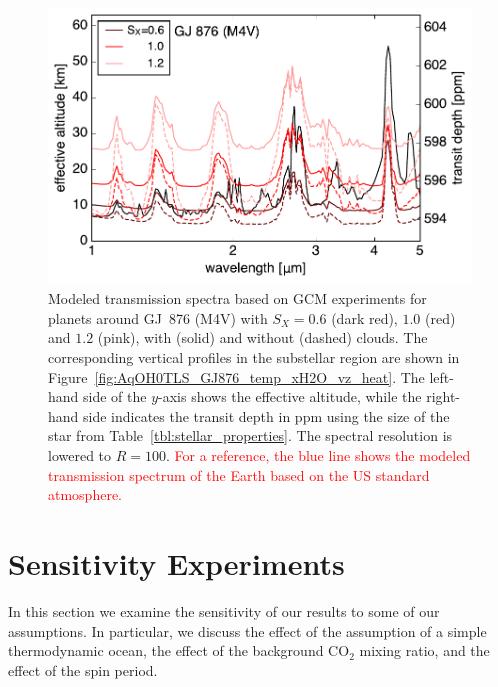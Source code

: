 \documentclass[11pt,numberedappendix,twocolappendix,]{emulateapj}
\def\addYF#1{\textcolor{red}{#1}}
\begin{document}
\begin{figure}[!h]
    \begin{center}
    \includegraphics[width=\hsize]{transit_GJ876_USstandard.pdf}
    \end{center}
\caption{Modeled transmission spectra based on GCM experiments for planets around GJ~876 (M4V) with $S_X=0.6$ (dark red), $1.0$ (red) and $1.2$ (pink), with (solid) and without (dashed) clouds. The corresponding vertical profiles in the substellar region are shown in Figure~\ref{fig:AqOH0TLS_GJ876_temp_xH2O_vz_heat}. The left-hand side of the $y$-axis shows the effective altitude, while the right-hand side indicates the transit depth in ppm using the size of the star from Table~\ref{tbl:stellar_properties}. The spectral resolution is lowered to $R=100$. 
\addYF{For a reference, the blue line shows the modeled transmission spectrum of the Earth based on the US standard atmosphere. }}
\label{fig:transmission}
\end{figure}


\section{Sensitivity Experiments }
\label{s:sensitivity}

In this section we examine the sensitivity of our results to some of our assumptions. 
In particular, we discuss the effect of the assumption of a simple thermodynamic ocean, the effect of the background CO$_2$ mixing ratio, and the effect of the spin period. 
\end{document}
